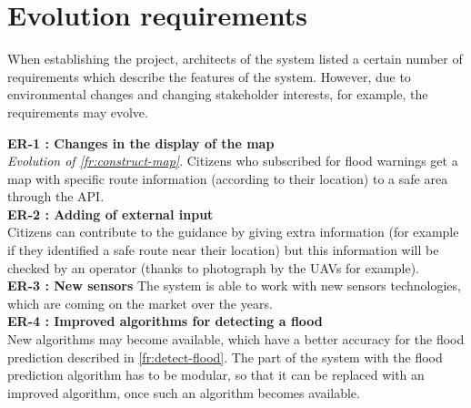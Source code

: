 \section{Evolution requirements}
When establishing the project, architects of the system listed a certain number of requirements which describe the features of the system. However, due to environmental changes and changing stakeholder interests, for example, the requirements may evolve.

\textbf{ER-1 : Changes in the display of the map } \\
\textit { Evolution of \ref{fr:construct-map}}. Citizens who subscribed for flood warnings get a map with specific route information (according to their location) to a safe area through the API. \\

\textbf{ER-2 : Adding of external input}\\
 Citizens can contribute to the guidance by giving extra information (for example if they identified a safe route near their location) but this information will be checked by an operator (thanks to photograph by the UAVs for example). \\
 
\textbf{ER-3 : New sensors } The system is able to work with new sensors technologies, which are coming on the market over the years. \\

\textbf{ER-4 : Improved algorithms for detecting a flood} \\
New algorithms may become available, which have a better accuracy for the flood prediction described in \ref{fr:detect-flood}. The part of the system with the flood prediction algorithm has to be modular, so that it can be replaced with an improved algorithm, once such an algorithm becomes available.


